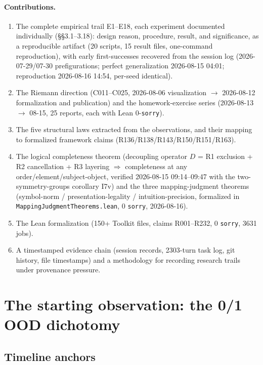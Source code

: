 \documentclass[sigplan,10pt,anonymous,review]{acmart}
\begin{document}
\paragraph{Contributions.}
\begin{enumerate}
\item The complete empirical trail E1--E18, each experiment documented
individually (\S\S3.1--3.18): design reason, procedure, result, and
significance, as a reproducible artifact (20 scripts, 15 result files,
one-command reproduction), with early first-successes recovered from the
session log (2026-07-29/07-30 prefigurations; perfect generalization
2026-08-15 04:01; reproduction 2026-08-16 14:54, per-seed identical).
\item The Riemann direction (C011--C025, 2026-08-06 visualization $\to$
2026-08-12 formalization and publication) and the homework-exercise series
(2026-08-13 $\to$ 08-15, 25 reports, each with Lean 0-\texttt{sorry}).
\item The five structural laws extracted from the observations, and their
mapping to formalized framework claims (R136/R138/R143/R150/R151/R163).
\item The logical completeness theorem (decoupling operator $D$ = R1
exclusion + R2 cancellation + R3 layering $\Longrightarrow$ completeness at
any order/element/subject-object, verified 2026-08-15 09:14--09:47 with the
two-symmetry-groups corollary I7v) and the three mapping-judgment theorems
(symbol-norm / presentation-legality / intuition-precision, formalized in
\texttt{MappingJudgmentTheorems.lean}, 0 \texttt{sorry}, 2026-08-16).
\item The Lean formalization (150+ Toolkit files, claims R001--R232, 0
\texttt{sorry}, 3631 jobs).
\item A timestamped evidence chain (session records, 2303-turn task log, git
history, file timestamps) and a methodology for recording research trails
under provenance pressure.
\end{enumerate}

\section{The starting observation: the 0/1 OOD dichotomy}

\subsection{Timeline anchors}
\end{document}
